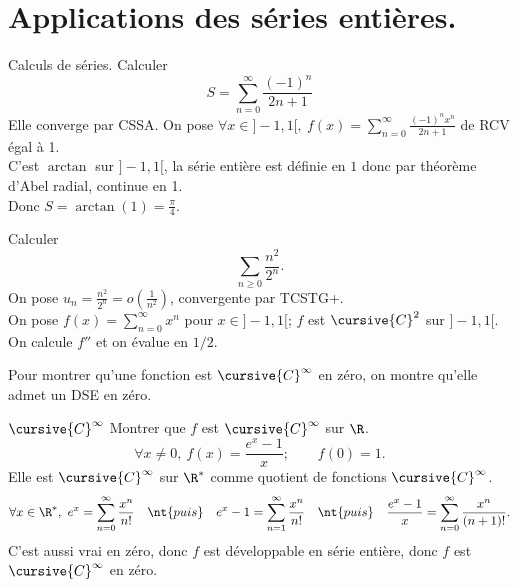 \documentclass[11pt]{article}
\begin{document}
\pagebreak

\section{Applications des séries entières.}

\begin{ex}{Calculs de séries.}{}
    Calculer
    \begin{equation*}
        S=\sum_{n=0}^\infty\frac{(-1)^n}{2n+1}
    \end{equation*}
    \tcblower
    Elle converge par CSSA. On pose $\forall x \in ]-1,1[, ~ f(x)=\sum_{n=0}^\infty \frac{(-1)^nx^n}{2n+1}$ de RCV égal à 1.\\
    C'est $\arctan$ sur $]-1,1[$, la série entière est définie en $1$ donc par théorème d'Abel radial, continue en 1.\\
    Donc $S=\arctan(1)=\frac{\pi}{4}$.
\end{ex}

\vspace*{-0.8cm}

\begin{ex}{}{}
    Calculer
    \begin{equation*}
        \sum_{n\geq0}\frac{n^2}{2^n}.
    \end{equation*}
    \tcblower
    On pose $u_n=\frac{n^2}{2^n}=o\left( \frac{1}{n^2} \right)$, convergente par TCSTG+.\\
    On pose $f(x)=\sum_{n=0}^\infty x^n$ pour $x\in]-1,1[$; $f$ est $\cursive{C}^2$ sur $]-1,1[$.\\
    On calcule $f''$ et on évalue en $1/2$.
\end{ex}

\vspace*{-0.8cm}

\begin{meth}{}{}
    Pour montrer qu'une fonction est $\cursive{C}^\infty$ en zéro, on montre qu'elle admet un DSE en zéro.
\end{meth}

\vspace*{-0.8cm}

\begin{ex}{$\cursive{C}^\infty$}{}
    Montrer que $f$ est $\cursive{C}^\infty$ sur $\R$.
    \begin{equation*}
        \forall x \neq 0, ~ f(x)=\frac{e^x-1}{x}; \qquad f(0)=1.
    \end{equation*}
    \tcblower
    Elle est $\cursive{C}^\infty$ sur $\R^*$ comme quotient de fonctions $\cursive{C}^\infty$.
    \begin{equation*}
        \forall x \in \R^*, ~ e^x = \sum_{n=0}^\infty \frac{x^n}{n!} \quad\nt{puis}\quad e^x-1=\sum_{n=1}^\infty\frac{x^n}{n!} \quad\nt{puis}\quad \frac{e^x-1}{x}=\sum_{n=0}^\infty\frac{x^n}{(n+1)!}.
    \end{equation*}
    C'est aussi vrai en zéro, donc $f$ est développable en série entière, donc $f$ est $\cursive{C}^\infty$ en zéro.
\end{ex}
\end{document}
